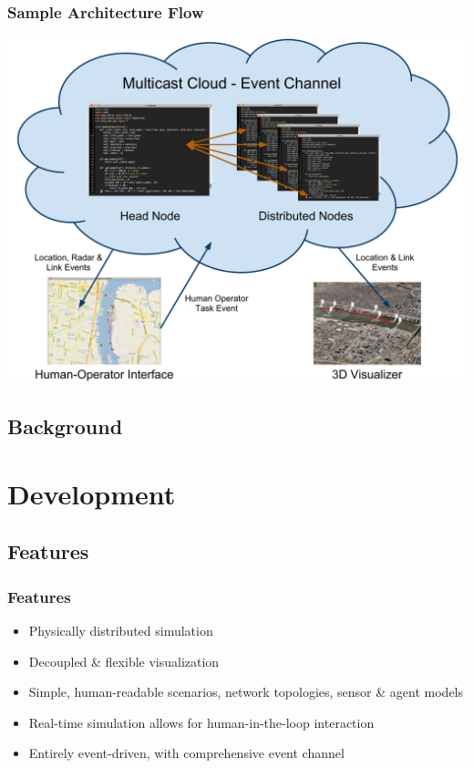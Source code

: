 \documentclass[mathserif,usenames,dvipsnames]{beamer}
\begin{document}
\frame
{
    \frametitle{Sample Architecture Flow}
    \begin{center}
        \includegraphics[scale=.48]{../common/demo.pdf}
    \end{center}
}


\subsection{Background}
\section{Development}
\subsection{Features}
\frame
{
    \frametitle{Features}
    \begin{itemize}
        \item Physically distributed simulation
        \item Decoupled \& flexible visualization
        \item Simple, human-readable scenarios, network topologies, sensor \& agent models
        \item Real-time simulation allows for human-in-the-loop interaction
        \item Entirely event-driven, with comprehensive event channel 
    \end{itemize}
}
\end{document}
